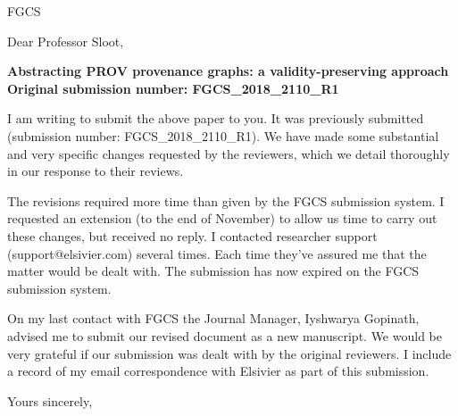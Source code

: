 \documentclass[12pt]{letter}
\begin{document}
\begin{letter}{FGCS }

\opening{Dear Professor Sloot,}

\begin{center}
  {\bf    Abstracting PROV provenance graphs: a validity-preserving approach \\ Original submission number: FGCS\_2018\_2110\_R1}
\end{center}

I am writing to submit the above paper to you. It was previously submitted (submission number: FGCS\_2018\_2110\_R1).  We have made some substantial and very specific changes requested by the reviewers,  which we detail thoroughly in our response to their reviews. %

The revisions required more time than given by the FGCS submission system. I requested an extension (to the end of November) to allow us time to carry out these changes, but received no reply. I contacted researcher support (support@elsivier.com) several times. Each time they've assured me that the matter would be dealt with. The submission has now expired on the FGCS submission system. 

On my last contact with FGCS the Journal Manager, Iyshwarya Gopinath, advised me to submit our revised document as a new manuscript.
We would be very grateful if our submission was dealt with by the original reviewers.
I include a record of my email correspondence with Elsivier as part of this submission. 

\closing{Yours sincerely,}

\end{letter}
\end{document}
